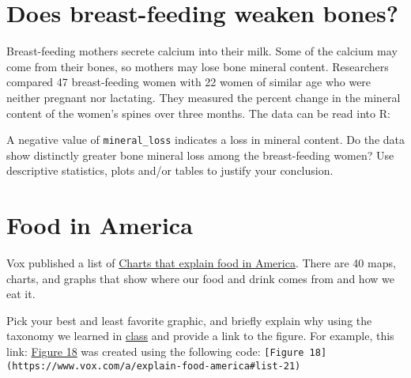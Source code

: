 \documentclass[letterpaper,9pt,twoside,printwatermark=false]{pinp}
\begin{document}
\section{Does breast-feeding weaken
bones?}\label{does-breast-feeding-weaken-bones}

Breast-feeding mothers secrete calcium into their milk. Some of the
calcium may come from their bones, so mothers may lose bone mineral
content. Researchers compared 47 breast-feeding women with 22 women of
similar age who were neither pregnant nor lactating. They measured the
percent change in the mineral content of the women's spines over three
months. The data can be read into R:

\begin{Shaded}
\begin{Highlighting}[]
\StringTok{ }\NormalTok{(}\NormalTok{)}
\end{Highlighting}
\end{Shaded}

A negative value of \texttt{mineral\_loss} indicates a loss in mineral
content. Do the data show distinctly greater bone mineral loss among the
breast-feeding women? Use descriptive statistics, plots and/or tables to
justify your conclusion.

\section{Food in America}\label{food-in-america}

Vox published a list of
\href{http://www.vox.com/a/explain-food-america}{Charts that explain
food in America}. There are 40 maps, charts, and graphs that show where
our food and drink comes from and how we eat it.

Pick your best and least favorite graphic, and briefly explain why using
the taxonomy we learned in
\href{https://docs.google.com/presentation/d/1wXgcTzcRKl_leGRfNZjWWPkjwJSTlZSXBCl-fFuLEaE/edit?usp=sharing}{class}
and provide a link to the figure. For example, this link:
\href{https://www.vox.com/a/explain-food-america\#list-21}{Figure 18}
was created using the following code:
\texttt{{[}Figure\ 18{]}(https://www.vox.com/a/explain-food-america\#list-21)}





\end{document}
